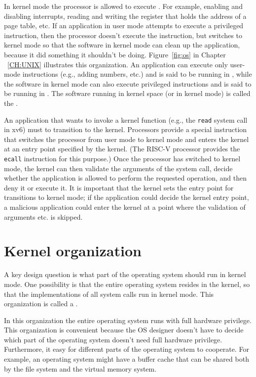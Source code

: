 In kernel mode the processor is allowed to execute 
.
For example, enabling and disabling interrupts,  reading and writing
the register that holds the address of a page table, etc.
If an application in user mode attempts to execute
a privileged instruction, then the processor doesn't execute the instruction, but switches
to kernel mode so that the software in kernel mode can clean up the application,
because it did something it shouldn't be doing. 
Figure~\ref{fig:os}
in Chapter ~\ref{CH:UNIX} illustrates this organization.  An application can
execute only user-mode instructions (e.g., adding numbers, etc.) and is said to
be running in 
,
while the software in kernel mode can also execute privileged instructions and
is said to be running in
.
The software running in kernel space (or in kernel mode) is called
the
.

An application that wants to invoke a kernel function (e.g., the
\lstinline{read}
system call in xv6) must to
transition to the kernel.  Processors provide a special instruction that switches the
processor from user mode to kernel mode and enters the kernel at an entry point
specified by the kernel.  (The RISC-V
processor provides the 
\lstinline{ecall}
instruction for this purpose.)  Once the processor has switched to kernel mode,
the kernel can then validate the arguments of the system call, decide whether
the application is allowed to perform the requested operation, and then deny it
or execute it.  It is important that the kernel sets the entry point for
transitions to kernel mode; if the application could decide the kernel entry
point, a malicious application could enter the kernel at a point where the
validation of arguments etc. is skipped.
\section{Kernel organization}

A key design question is what part of the operating
system should run in kernel mode. 
One possibility is that the entire operating system resides
in the kernel, so that the implementations of all system calls
run in kernel mode.
This organization is called a
.

In this organization the entire operating system runs with full hardware
privilege. This organization is convenient because the OS designer doesn't have
to decide which part of the operating system doesn't need full hardware
privilege.  Furthermore, it easy for different parts of the operating system to
cooperate.  For example, an operating system might have a buffer cache that can
be shared both by the file system and the virtual memory system. 

